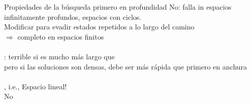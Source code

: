 \begin{frame}{Propiedades de la b\'usqueda primero en profundidad}
     No: falla in espacios infinitamente profundos, espacios con ciclos.\\
    \quad Modificar para evadir estados repetidos a lo largo del camino\\
    \quad $\Rightarrow$ completo en espacios finitos\\~\\
    
    : terrible si  es mucho m\'as largo que \\
    \quad pero si las soluciones son densas, debe ser m\'as r\'apida que primero en anchura\\~\\
    
    , i.e., Espacio lineal!\\
     No

\end{frame}